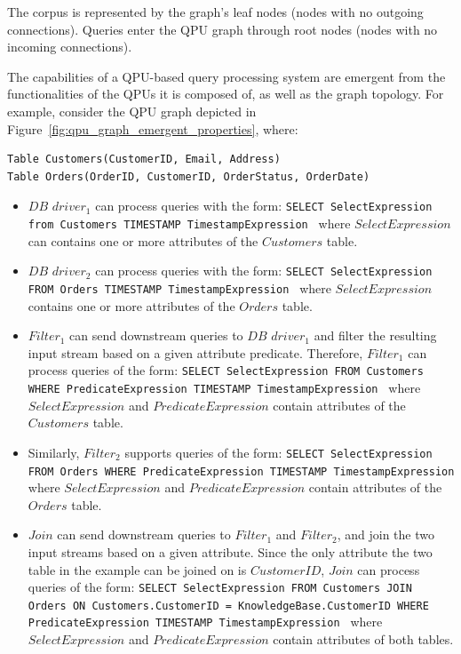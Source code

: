 The corpus is represented by the graph's leaf nodes (nodes with no outgoing connections).
Queries enter the QPU graph through root nodes (nodes with no incoming connections).

The capabilities of a QPU-based query processing system are emergent from the functionalities of the QPUs it is composed of,
as well as the graph topology.
For example, consider the QPU graph depicted in Figure~\ref{fig:qpu_graph_emergent_properties}, where:

\begin{lstlisting}[caption={Customer and Orders tables attributes},captionpos=b,]
Table Customers(CustomerID, Email, Address)
Table Orders(OrderID, CustomerID, OrderStatus, OrderDate)
\end{lstlisting}

\begin{itemize}
  \item $DB$ $driver_1$ can process queries with the form:
  {\obeylines\obeyspaces
  \texttt{SELECT SelectExpression from Customers TIMESTAMP TimestampExpression
  }}
  where $SelectExpression$ can contains one or more attributes of the $Customers$ table.

\item $DB$ $driver_2$ can process queries with the form:
{\obeylines\obeyspaces
\texttt{SELECT SelectExpression FROM Orders TIMESTAMP TimestampExpression
}}
where $SelectExpression$ contains one or more attributes of the $Orders$ table.

\item $Filter_1$ can send downstream queries to $DB$ $driver_1$ and filter the resulting input stream based on a given
attribute predicate.
Therefore, $Filter_1$ can process queries of the form:
{\obeylines\obeyspaces
\texttt{SELECT SelectExpression FROM Customers
        WHERE PredicateExpression
        TIMESTAMP TimestampExpression
        }}
where $SelectExpression$ and $PredicateExpression$ contain attributes of the $Customers$ table.

\item Similarly, $Filter_2$ supports queries of the form:
{\obeylines\obeyspaces
\texttt{SELECT SelectExpression FROM Orders
        WHERE PredicateExpression
        TIMESTAMP TimestampExpression
        }}
where $SelectExpression$ and $PredicateExpression$ contain attributes of the $Orders$ table.

\item $Join$ can send downstream queries to $Filter_1$ and $Filter_2$,
and join the two input streams based on a given attribute.
Since the only attribute the two table in the example can be joined on is $CustomerID$,
$Join$ can process queries of the form:
{\obeylines\obeyspaces
\texttt{SELECT SelectExpression
        FROM Customers JOIN Orders ON Customers.CustomerID = KnowledgeBase.CustomerID
        WHERE PredicateExpression
        TIMESTAMP TimestampExpression
        }}
where $SelectExpression$ and $PredicateExpression$ contain attributes of both tables.

\end{itemize}

